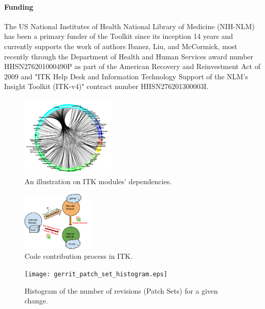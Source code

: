 \documentclass{frontiersENG} %
\begin{document}
\paragraph{Funding\textcolon} The US National Institutes of Health National
Library of Medicine (NIH-NLM) has been a primary funder of the Toolkit since
its inception 14 years and currently supports the work of authors Ibanez, Liu,
and McCormick, most recently through the Department of Health and Human
Services award number HHSN276201000490P as part of the American Recovery and
Reinvestment Act of 2009 and "ITK Help Desk and Information Technology Support
of the NLM's Insight Toolkit (ITK-v4)" contract number HHSN276201300003I.


\begin{figure}
  \centering
    \includegraphics[width=0.4\textwidth]{itk_module_dependency.png}
    \caption{ An illustration on ITK modules' dependencies.}
    \label{fig:itk_module_dependency}
\end{figure}

\begin{figure}
  \centering
    \includegraphics[width=0.3\textwidth]{itk_code_contribution.png}
    \caption{ Code contribution process in ITK.}
    \label{fig:itk_module_dependency}
\end{figure}

\begin{figure}
  \centering
    \texttt{[image: gerrit\_patch\_set\_histogram.eps]}
    \caption{Histogram of the number of revisions (Patch Sets) for a given change.}
    \label{fig:gerrit_patch_set_histogram}
\end{figure}
\end{document}
